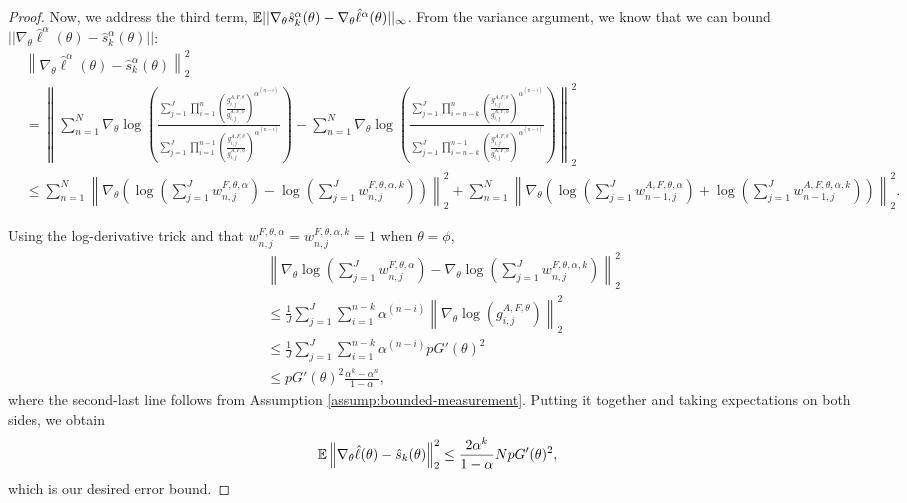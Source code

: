 \begin{proof}
Now, we address the third term, $\mathbb{E}||\nabla_\theta\hat s_k^\alpha(\theta) -  \nabla_\theta\hat\ell^\alpha(\theta)||_\infty$. From the variance argument, we know that we can bound $||\nabla_\theta\hat\ell^\alpha(\theta) - \hat s_k^\alpha(\theta)||$:
\begin{align}
    &\left\lVert\nabla_\theta\hat\ell^\alpha(\theta) - \hat s_k^\alpha(\theta) \right\rVert_2^2\\
    &= \left\lVert\sum_{n=1}^N \nabla_\theta \log\left(\frac{\sum_{j=1}^J\prod_{i=1}^n\left(\frac{g_{i,j}^{A,F,\theta}}{g_{i,j}^{A,F,\phi}} \right)^{\alpha^{(n-i)}}}{\sum_{j=1}^J\prod_{i=1}^{n-1}\left(\frac{g_{i,j}^{A,F,\theta}}{g_{i,j}^{A,F,\phi}} \right)^{\alpha^{(n-i)}}}\right) - \sum_{n=1}^N \nabla_\theta\log\left(\frac{\sum_{j=1}^J\prod_{i=n-k}^n\left(\frac{g_{i,j}^{A,F,\theta}}{g_{i,j}^{A,F,\phi}} \right)^{\alpha^{(n-i)}}}{\sum_{j=1}^J\prod_{i=n-k}^{n-1}\left(\frac{g_{i,j}^{A,F,\theta}}{g_{i,j}^{A,F,\phi}} \right)^{\alpha^{(n-i)}}}\right) \right\rVert_2^2\\
    &\leq \sum_{n=1}^N \left\lVert\nabla_\theta \left(\log\left(\sum_{j=1}^Jw_{n,j}^{F,\theta,\alpha}\right)- \log\left(\sum_{j=1}^Jw_{n,j}^{F,\theta,\alpha,k}\right)\right)\right\lVert_2^2
    +\sum_{n=1}^N \left\lVert\nabla_\theta \left(\log\left(\sum_{j=1}^Jw_{n-1,j}^{A, F,\theta, \alpha}\right) + \log\left(\sum_{j=1}^Jw_{n-1,j}^{A, F,\theta,\alpha, k}\right)\right)\right\rVert_2^2.
\end{align}

Using the log-derivative trick and that $w_{n,j}^{F,\theta,\alpha} = w_{n,j}^{F,\theta,\alpha,k} = 1$ when $\theta=\phi$,
\begin{align}
    &\left\lVert\nabla_\theta\log\left(\sum_{j=1}^J w_{n,j}^{F,\theta,\alpha}\right)-\nabla_\theta\log\left(\sum_{j=1}^J w_{n,j}^{F,\theta,\alpha,k}\right)\right\rVert_2^2\\
    &\leq \frac{1}{J}\sum_{j=1}^J \sum_{i=1}^{n-k}\alpha^{(n-i)}\left\lVert\nabla_\theta\log\left(g_{i,j}^{A,F,\theta} \right)\right\rVert_2^2\\
    &\leq \frac{1}{J}\sum_{j=1}^J \sum_{i=1}^{n-k}\alpha^{(n-i)}pG'(\theta)^2\\
    &\leq pG'(\theta)^2\frac{\alpha^k-\alpha^n}{1-\alpha},
\end{align}
where the second-last line follows from Assumption \ref{assump:bounded-measurement}. Putting it together and taking expectations on both sides, we obtain
$$\mathbb{E}\left\lVert\nabla_\theta\hat\ell(\theta) - \hat s_k(\theta) \right\rVert_2^2 \leq  \frac{2\alpha^k}{1-\alpha}NpG'(\theta)^2,$$
which is our desired error bound. 


\end{proof}
